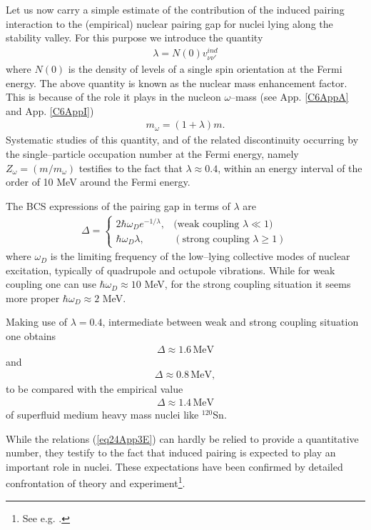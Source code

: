 \begin{subappendices}
Let us now carry a simple estimate of the contribution of the induced pairing interaction to the (empirical) nuclear pairing gap for nuclei lying along the stability valley. For this purpose we introduce the quantity
 \begin{align}
\lambda=N(0)v_{\nu\nu'}^{ind}
 \end{align}
where $N(0)$ is the density of levels of a single spin orientation at the Fermi energy. The above quantity is known as the nuclear mass enhancement factor. This is because of the role it plays in the nucleon $\omega$--mass (see App. \ref{C6AppA} and App. \ref{C6AppI})
 \begin{align}
m_\omega=(1+\lambda)m.
 \end{align}
Systematic studies of this quantity, and of the related discontinuity occurring by the single--particle occupation number at the Fermi energy, namely $Z_\omega=(m/m_\omega)$ testifies to the fact that $\lambda\approx0.4$, within an energy interval of the order of 10 MeV around the Fermi energy.


The BCS expressions of the pairing gap in terms of $\lambda$ are
\begin{align}\label{eq24App3E}
\Delta=\left\{\begin{array}{ll}
2\hbar\omega_De^{-1/\lambda},&\text{(weak coupling } \lambda\ll1)\\ 
\hbar\omega_D\lambda,&(\text{strong coupling }\lambda\geq1)
\end{array}
\right. 
\end{align}
where $\omega_D$ is the limiting frequency of the low--lying collective modes of nuclear excitation, typically of quadrupole and octupole vibrations. While for weak coupling one can use $\hbar\omega_D\approx10$ MeV, for the strong coupling situation it seems more proper $\hbar\omega_D\approx 2$ MeV.


Making use of $\lambda=0.4$, intermediate between weak and strong coupling situation one obtains
\begin{align}
\Delta\approx1.6\,\text{MeV}
\end{align}
and
\begin{align}
\Delta\approx0.8\,\text{MeV},
\end{align}
to be compared with the empirical value
\begin{align}
\Delta\approx1.4\,\text{MeV}
\end{align}
of superfluid medium heavy mass nuclei like $^{120}$Sn.

While the relations (\ref{eq24App3E}) can hardly be relied to provide a quantitative number, they testify to the fact that induced pairing is expected to play an important role in nuclei. These expectations have been confirmed by detailed confrontation of theory and experiment\footnote{See e.g. \cite{Idini:15}.}.

\end{subappendices}
